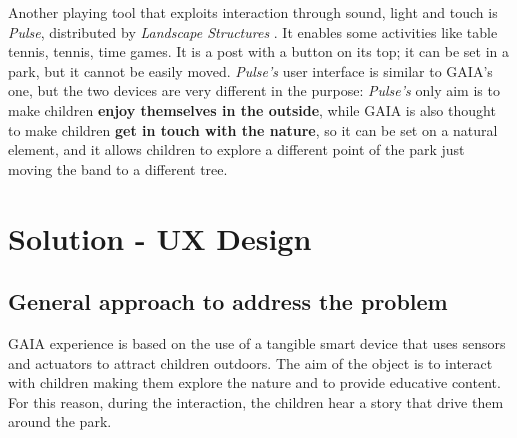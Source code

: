 \documentclass[a4paper,11pt]{report}
\begin{document}
Another playing tool that exploits interaction through sound, light and touch is \emph{Pulse\textregistered}, distributed by \emph{Landscape Structures} \cite{pulse}. It enables some activities like table tennis, tennis, time games. It is a post with a button on its top; it can be set in a park, but it cannot be easily moved. \emph{Pulse\textregistered's} user interface is similar to GAIA's one, but the two devices are very different in the purpose:  \emph{Pulse\textregistered's} only aim is to make children \textbf{enjoy themselves in the outside}, while GAIA is also thought to make children \textbf{get in touch with the nature}, so it can be set on a natural element, and it allows children to explore a different point of the park just moving the band to a different tree. 
\chapter{Solution - UX Design}
\section{General approach to address the problem}
GAIA experience is based on the use of a tangible smart device that uses sensors and actuators to attract children outdoors. The aim of the object is to interact with children making them explore the nature and to provide educative content. For this reason, during the interaction, the children hear a story that drive them around the park.
\end{document}
